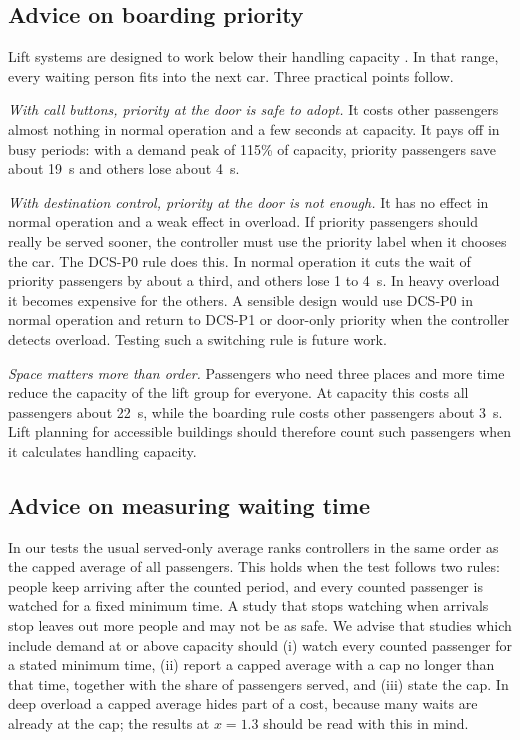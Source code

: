 \subsection{Advice on boarding priority}
Lift systems are designed to work below their handling capacity \cite{cibse2025,iso8100}. In that range, every waiting person fits into the next car. Three practical points follow.

\emph{With call buttons, priority at the door is safe to adopt.} It costs other passengers almost nothing in normal operation and a few seconds at capacity. It pays off in busy periods: with a demand peak of 115\% of capacity, priority passengers save about 19~s and others lose about 4~s.

\emph{With destination control, priority at the door is not enough.} It has no effect in normal operation and a weak effect in overload. If priority passengers should really be served sooner, the controller must use the priority label when it chooses the car. The DCS-P0 rule does this. In normal operation it cuts the wait of priority passengers by about a third, and others lose 1 to 4~s. In heavy overload it becomes expensive for the others. A sensible design would use DCS-P0 in normal operation and return to DCS-P1 or door-only priority when the controller detects overload. Testing such a switching rule is future work.

\emph{Space matters more than order.} Passengers who need three places and more time reduce the capacity of the lift group for everyone. At capacity this costs all passengers about 22~s, while the boarding rule costs other passengers about 3~s. Lift planning for accessible buildings should therefore count such passengers when it calculates handling capacity.

\subsection{Advice on measuring waiting time}
In our tests the usual served-only average ranks controllers in the same order as the capped average of all passengers. This holds when the test follows two rules: people keep arriving after the counted period, and every counted passenger is watched for a fixed minimum time. A study that stops watching when arrivals stop leaves out more people and may not be as safe. We advise that studies which include demand at or above capacity should (i) watch every counted passenger for a stated minimum time, (ii) report a capped average with a cap no longer than that time, together with the share of passengers served, and (iii) state the cap. In deep overload a capped average hides part of a cost, because many waits are already at the cap; the results at $x=1.3$ should be read with this in mind.


